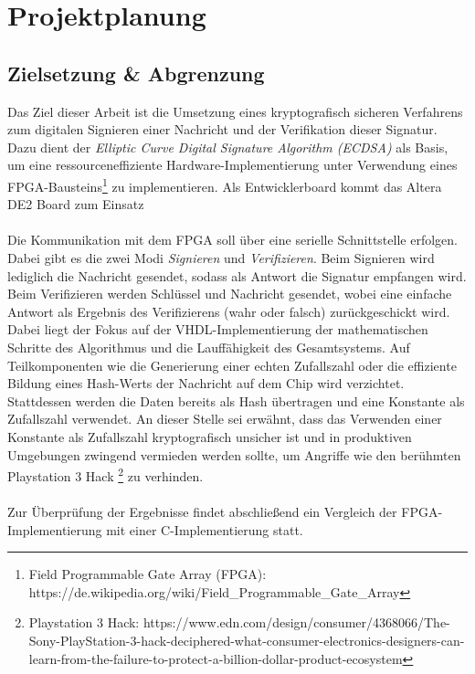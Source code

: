 
\chapter{Projektplanung} \label{sec:planung}


\section{Zielsetzung \& Abgrenzung} \label{sec:ziele}
Das Ziel dieser Arbeit ist die Umsetzung eines kryptografisch sicheren Verfahrens zum digitalen Signieren einer Nachricht und der Verifikation dieser Signatur. Dazu dient der \textit{Elliptic Curve Digital Signature Algorithm (ECDSA)} als Basis, um eine ressourceneffiziente Hardware-Implementierung unter Verwendung eines FPGA-Bausteins\footnote{Field Programmable Gate Array (FPGA): https://de.wikipedia.org/wiki/Field\_Programmable\_Gate\_Array} zu implementieren. Als Entwicklerboard kommt das Altera DE2 Board zum Einsatz 
\\ \\
Die Kommunikation mit dem FPGA soll über eine serielle Schnittstelle erfolgen. Dabei gibt es die zwei Modi \textit{Signieren} und \textit{Verifizieren}. Beim Signieren wird lediglich die Nachricht gesendet, sodass als Antwort die Signatur empfangen wird. Beim Verifizieren werden Schlüssel und Nachricht gesendet, wobei eine einfache Antwort als Ergebnis des Verifizierens (wahr oder falsch) zurückgeschickt wird. Dabei liegt der Fokus auf der VHDL-Implementierung der mathematischen Schritte des Algorithmus und die Lauffähigkeit des Gesamtsystems. Auf Teilkomponenten wie die Generierung einer echten Zufallszahl oder die effiziente Bildung eines Hash-Werts der Nachricht auf dem Chip wird verzichtet. Stattdessen werden die Daten bereits als Hash übertragen und eine Konstante als Zufallszahl verwendet. An dieser Stelle sei erwähnt, dass das Verwenden einer Konstante als Zufallszahl kryptografisch unsicher ist und in produktiven Umgebungen zwingend vermieden werden sollte, um Angriffe wie den berühmten Playstation 3 Hack \footnote{Playstation 3 Hack: https://www.edn.com/design/consumer/4368066/The-Sony-PlayStation-3-hack-deciphered-what-consumer-electronics-designers-can-learn-from-the-failure-to-protect-a-billion-dollar-product-ecosystem} zu verhinden.  
\\ \\
Zur Überprüfung der Ergebnisse findet abschließend ein Vergleich der FPGA-Implementierung mit einer C-Implementierung statt.


